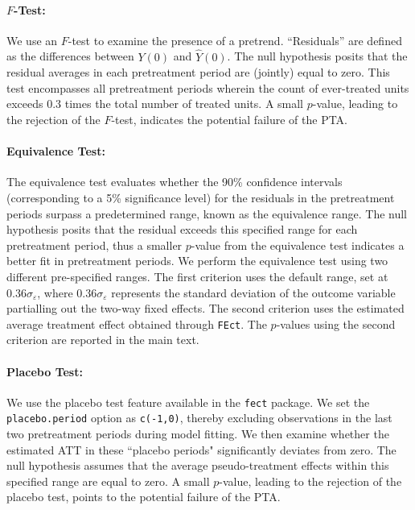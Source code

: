 \documentclass[12pt]{article}
\begin{document}
\paragraph*{$F$-Test:} We use an $F$-test to examine the presence of a pretrend. ``Residuals'' are defined as the differences between $Y(0)$ and $\hat{Y}(0)$. The null hypothesis posits that the residual averages in each pretreatment period are (jointly) equal to zero. This test encompasses all pretreatment periods wherein the count of ever-treated units exceeds 0.3 times the total number of treated units. A small $p$-value, leading to the rejection of the $F$-test, indicates the potential failure of the PTA.

\paragraph*{Equivalence Test:} The equivalence test evaluates whether the 90\% confidence intervals (corresponding to a 5\% significance level) for the residuals in the pretreatment periods surpass a predetermined range, known as the equivalence range. The null hypothesis posits that the residual exceeds this specified range for each pretreatment period, thus a smaller $p$-value from the equivalence test indicates a better fit in pretreatment periods. We perform the equivalence test using two different pre-specified ranges. The first criterion uses the default range, set at $0.36\sigma_{\varepsilon}$, where $0.36\sigma_{\varepsilon}$ represents the standard deviation of the outcome variable partialling out the two-way fixed effects. The second criterion uses the estimated average treatment effect obtained through \texttt{FEct}. The $p$-values using the second criterion are reported in the main text. 

\paragraph*{Placebo Test:} We use the placebo test feature available in the \texttt{fect} package. We set the \texttt{placebo.period} option as \texttt{c(-1,0)}, thereby excluding observations in the last two pretreatment periods during model fitting. We then examine whether the estimated ATT in these ``placebo periods" significantly deviates from zero. The null hypothesis assumes that the average pseudo-treatment effects within this specified range are equal to zero. A small $p$-value, leading to the rejection of the placebo test, points to the potential failure of the PTA.
\end{document}
